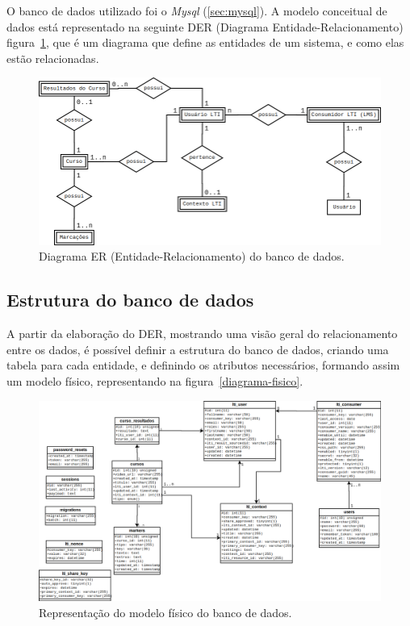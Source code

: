 O banco de dados utilizado foi o \textit{Mysql} (\autoref{sec:mysql}). A modelo conceitual de dados está representado na seguinte DER (Diagrama Entidade-Relacionamento) figura~\ref{fig:diagrama-er}, que é um diagrama que define as entidades de um sistema, e como elas estão relacionadas.

\begin{figure}[h]
    \centering
    \includegraphics[keepaspectratio=true,scale=0.4]{figuras/der_video_interativo.png}
    \caption{Diagrama ER (Entidade-Relacionamento) do banco de dados.}
    \label{fig:diagrama-er}
\end{figure}

\subsection{Estrutura do banco de dados}

A partir da elaboração do DER, mostrando uma visão geral do relacionamento entre os dados, é possível definir a estrutura do banco de dados, criando uma tabela para cada entidade, e definindo os atributos necessários, formando assim um modelo físico, representando na figura~\ref{diagrama-fisico}.

\begin{figure}[h]
    \centering
    \includegraphics[keepaspectratio=true,scale=0.35]{figuras/modelo_fisico_video_interativo.png}
    \caption{Representação do modelo físico do banco de dados.}
    \label{fig:diagrama-fisico}
\end{figure}

